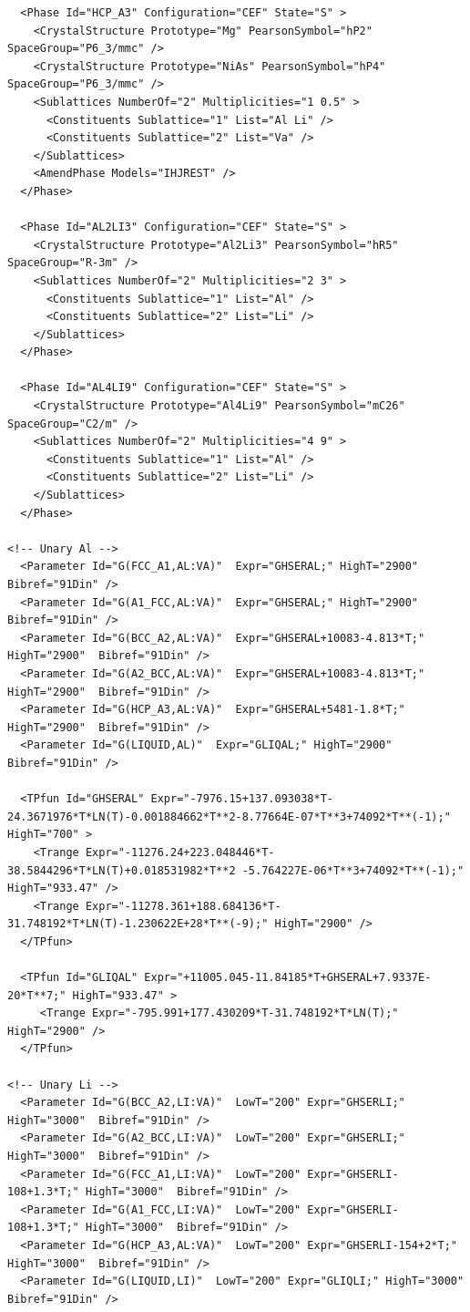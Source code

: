 \documentclass{article}
\begin{document}
\begin{appendices}
\begin{verbatim}
  <Phase Id="HCP_A3" Configuration="CEF" State="S" >
	<CrystalStructure Prototype="Mg" PearsonSymbol="hP2" SpaceGroup="P6_3/mmc" />
	<CrystalStructure Prototype="NiAs" PearsonSymbol="hP4" SpaceGroup="P6_3/mmc" />
    <Sublattices NumberOf="2" Multiplicities="1 0.5" >
      <Constituents Sublattice="1" List="Al Li" />
      <Constituents Sublattice="2" List="Va" />
    </Sublattices>
    <AmendPhase Models="IHJREST" />
  </Phase>

  <Phase Id="AL2LI3" Configuration="CEF" State="S" >
	<CrystalStructure Prototype="Al2Li3" PearsonSymbol="hR5" SpaceGroup="R-3m" />
    <Sublattices NumberOf="2" Multiplicities="2 3" >
      <Constituents Sublattice="1" List="Al" />
      <Constituents Sublattice="2" List="Li" />
    </Sublattices>
  </Phase>

  <Phase Id="AL4LI9" Configuration="CEF" State="S" >
	<CrystalStructure Prototype="Al4Li9" PearsonSymbol="mC26" SpaceGroup="C2/m" />
    <Sublattices NumberOf="2" Multiplicities="4 9" >
      <Constituents Sublattice="1" List="Al" />
      <Constituents Sublattice="2" List="Li" />
    </Sublattices>
  </Phase>

<!-- Unary Al -->
  <Parameter Id="G(FCC_A1,AL:VA)"  Expr="GHSERAL;" HighT="2900"  Bibref="91Din" />
  <Parameter Id="G(A1_FCC,AL:VA)"  Expr="GHSERAL;" HighT="2900"  Bibref="91Din" />
  <Parameter Id="G(BCC_A2,AL:VA)"  Expr="GHSERAL+10083-4.813*T;" HighT="2900"  Bibref="91Din" />
  <Parameter Id="G(A2_BCC,AL:VA)"  Expr="GHSERAL+10083-4.813*T;" HighT="2900"  Bibref="91Din" />
  <Parameter Id="G(HCP_A3,AL:VA)"  Expr="GHSERAL+5481-1.8*T;" HighT="2900"  Bibref="91Din" />
  <Parameter Id="G(LIQUID,AL)"  Expr="GLIQAL;" HighT="2900"  Bibref="91Din" />

  <TPfun Id="GHSERAL" Expr="-7976.15+137.093038*T-24.3671976*T*LN(T)-0.001884662*T**2-8.77664E-07*T**3+74092*T**(-1);" HighT="700" >
    <Trange Expr="-11276.24+223.048446*T-38.5844296*T*LN(T)+0.018531982*T**2 -5.764227E-06*T**3+74092*T**(-1);" HighT="933.47" /> 
    <Trange Expr="-11278.361+188.684136*T-31.748192*T*LN(T)-1.230622E+28*T**(-9);" HighT="2900" /> 
  </TPfun>

  <TPfun Id="GLIQAL" Expr="+11005.045-11.84185*T+GHSERAL+7.9337E-20*T**7;" HighT="933.47" >
     <Trange Expr="-795.991+177.430209*T-31.748192*T*LN(T);" HighT="2900" /> 
  </TPfun>

<!-- Unary Li -->
  <Parameter Id="G(BCC_A2,LI:VA)"  LowT="200" Expr="GHSERLI;" HighT="3000"  Bibref="91Din" />
  <Parameter Id="G(A2_BCC,LI:VA)"  LowT="200" Expr="GHSERLI;" HighT="3000"  Bibref="91Din" />
  <Parameter Id="G(FCC_A1,LI:VA)"  LowT="200" Expr="GHSERLI-108+1.3*T;" HighT="3000"  Bibref="91Din" />
  <Parameter Id="G(A1_FCC,LI:VA)"  LowT="200" Expr="GHSERLI-108+1.3*T;" HighT="3000"  Bibref="91Din" />
  <Parameter Id="G(HCP_A3,AL:VA)"  LowT="200" Expr="GHSERLI-154+2*T;" HighT="3000"  Bibref="91Din" />
  <Parameter Id="G(LIQUID,LI)"  LowT="200" Expr="GLIQLI;" HighT="3000"  Bibref="91Din" />


\end{verbatim}
\end{appendices}
\end{document}
